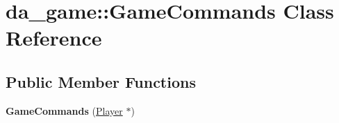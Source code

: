 \hypertarget{classda__game_1_1GameCommands}{
\section{da\_\-game::GameCommands Class Reference}
\label{classda__game_1_1GameCommands}
}
\subsection*{Public Member Functions}
\begin{DoxyCompactItemize}
\item 
\hypertarget{classda__game_1_1GameCommands_a7f93d626b2cf6b976c49da0a038ef2ea}{
{\bfseries GameCommands} (\hyperlink{classda__game_1_1Player}{Player} $\ast$)}
\label{classda__game_1_1GameCommands_a7f93d626b2cf6b976c49da0a038ef2ea}

\end{DoxyCompactItemize}
